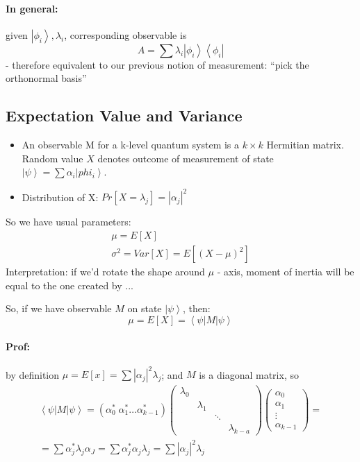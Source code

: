 \documentclass{scrartcl}
\newcommand{\ket}[1]{\left| #1 \right>} %
\newcommand{\bra}[1]{\left< #1 \right|} %
\begin{document}
\paragraph{In general: } given $\ket{\phi_i}, \lambda_i$, corresponding
observable is
$$A = \sum \lambda_i \ket{\phi_i}\bra{\phi_i}$$
- therefore equivalent to our previous notion of measurement: ``pick the
orthonormal basis''

\subsection{Expectation Value and Variance}
\label{sec:8-3}

\begin{itemize}
\item An observable M for a k-level quantum system is a $k\times k$ Hermitian
  matrix. Random value $X$ denotes outcome of measurement of state $\ket \psi =
  \sum \alpha_i \ket{phi_i}$.
\item Distribution of X: $Pr[X = \lambda_j] = |\alpha_j|^2$
\end{itemize}
So we have usual parameters:
\begin{gather*}
  \mu = E[X] \\ \sigma^2 = Var[X] = E[(X-\mu)^2]
\end{gather*}
Interpretation: if we'd rotate the shape around $\mu$ - axis, moment of inertia
will be equal to the one created by ...

So, if we have observable $M$ on state $\ket\psi$, then:
$$\mu=E[X]=\bra\psi M\ket\psi$$

\paragraph{Prof:} by definition $\mu = E[x] = \sum |\alpha_j|^2 \lambda_j$; and
$M$ is a diagonal matrix, so \begin{gather*}\bra\psi M\ket\psi = (\alpha_0^* \;
  \alpha_1^* \dots \alpha_{k-1}^*) \begin{pmatrix} \lambda_0 &&& \\ & \lambda_1
    && \\ && \ddots &\\ &&& \lambda_{k-a}\end{pmatrix} \begin{pmatrix} \alpha_0
    \\ \alpha_1
    \\ \vdots \\ \alpha_{k-1} \end{pmatrix} = \\
  = \sum \alpha_j^*\lambda_j\alpha_J = \sum \alpha_j^*\alpha_j\lambda_j = \sum
  |\alpha_j|^2 \lambda_j
\end{gather*}
\end{document}
